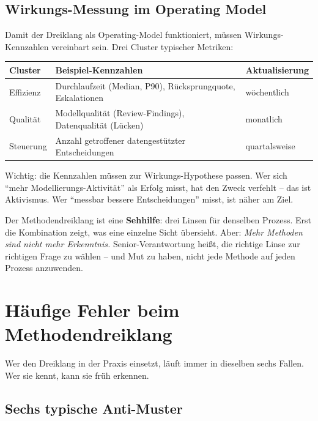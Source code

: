 \documentclass[11pt,a4paper,oneside]{article}
\begin{document}
\subsection{Wirkungs-Messung im Operating Model}

Damit der Dreiklang als Operating-Model funktioniert, müssen Wirkungs-Kennzahlen vereinbart sein. Drei Cluster typischer Metriken:

\begin{tabularx}{\linewidth}{@{}lXl@{}}
\toprule
\textbf{Cluster}            & \textbf{Beispiel-Kennzahlen}                              & \textbf{Aktualisierung} \\
\midrule
Effizienz                   & Durchlaufzeit (Median, P90), Rücksprungquote, Eskalationen & wöchentlich \\
Qualität                    & Modellqualität (Review-Findings), Datenqualität (Lücken)   & monatlich \\
Steuerung                   & Anzahl getroffener datengestützter Entscheidungen           & quartalsweise \\
\bottomrule
\end{tabularx}

\medskip

\noindent Wichtig: die Kennzahlen müssen zur Wirkungs-Hypothese passen. Wer sich ``mehr Modellierungs-Aktivität'' als Erfolg misst, hat den Zweck verfehlt -- das ist Aktivismus. Wer ``messbar bessere Entscheidungen'' misst, ist näher am Ziel.

\begin{merkbox}
Der Methodendreiklang ist eine \textbf{Sehhilfe}: drei Linsen für denselben Prozess. Erst die Kombination zeigt, was eine einzelne Sicht übersieht. Aber: \emph{Mehr Methoden sind nicht mehr Erkenntnis.} Senior-Verantwortung heißt, die richtige Linse zur richtigen Frage zu wählen -- und Mut zu haben, nicht jede Methode auf jeden Prozess anzuwenden.
\end{merkbox}

\section{Häufige Fehler beim Methodendreiklang}

Wer den Dreiklang in der Praxis einsetzt, läuft immer in dieselben sechs Fallen. Wer sie kennt, kann sie früh erkennen.

\subsection{Sechs typische Anti-Muster}
\end{document}
